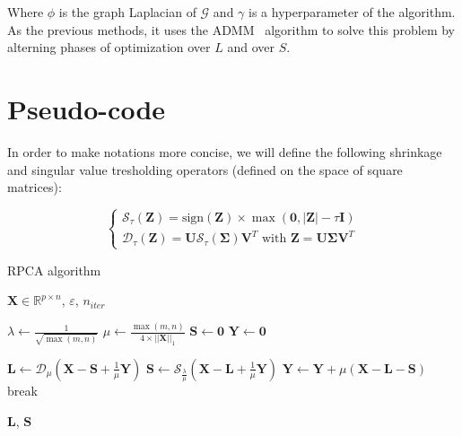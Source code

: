 \documentclass[sigconf]{acmart}
\newcommand{\sign}{\text{sign}}
\begin{document}
  Where $\phi$ is the graph Laplacian of $\mathcal{G}$ and $\gamma$ is a hyperparameter of the algorithm. As the previous methods, it uses the ADMM~\cite{admm_paper} algorithm to solve this problem by alterning phases of optimization over $L$ and over $S$.

\section{Pseudo-code}

In order to make notations more concise, we will define the following shrinkage and singular value tresholding operators (defined on the space of square matrices):

\begin{equation*}
  \begin{cases}
    \mathcal{S}_{\tau}(\mathbf{Z}) = \sign{(\mathbf{Z})} \times \max{(\mathbf{0}, |\mathbf{Z}| - \tau \mathbf{I})} \\
      \mathcal{D}_{\tau}(\mathbf{Z}) = \mathbf{U} \mathcal{S}_{\tau}(\mathbf{\Sigma}) \mathbf{V}^T \text{ with } \mathbf{Z} = \mathbf{U} \mathbf{\Sigma} \mathbf{V}^T
  \end{cases}
\end{equation*}

\begin{algorithm}
  \caption{RPCA algorithm}\label{alg:rpca}
  \begin{algorithmic}
      \Require $\mathbf{X} \in \mathbb{R}^{p \times n}$, $\varepsilon$, $n_{iter}$
      
      \State $\lambda \gets \frac{1}{\sqrt{\max(m, n)}}$
      \State $\mu \gets \frac{\max(m, n)}{4 \times ||\mathbf{X}||_1}$
      \State $\mathbf{S} \gets \mathbf{0}$
      \State $\mathbf{Y} \gets \mathbf{0}$
      
          \State $\mathbf{L} \gets \mathcal{D}_{\mu}(\mathbf{X} - \mathbf{S} + \frac{1}{\mu} \mathbf{Y})$
          \State $\mathbf{S} \gets \mathcal{S}_{\frac{\lambda}{\mu}} (\mathbf{X} - \mathbf{L} + \frac{1}{\mu} \mathbf{Y})$ 
          \State $\mathbf{Y} \gets \mathbf{Y} + \mu(\mathbf{X} - \mathbf{L} - \mathbf{S})$
              \State break\
          \EndIf
      \EndFor
      
      \State \Return $\mathbf{L}$, $\mathbf{S}$
  \end{algorithmic}
  \end{algorithm}
  
\end{document}
